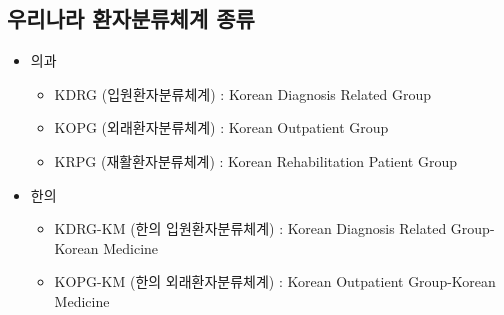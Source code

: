 \subsection{우리나라 환자분류체계 종류}
\begin{itemize}\tightlist
\item 의과
	\begin{itemize}\tightlist
	\item KDRG (입원환자분류체계) : Korean Diagnosis Related Group
	\item KOPG (외래환자분류체계) : Korean Outpatient Group
	\item KRPG (재활환자분류체계) : Korean Rehabilitation Patient Group
	\end{itemize}
\item 한의	
	\begin{itemize}\tightlist
	\item KDRG-KM (한의 입원환자분류체계) : Korean Diagnosis Related Group-Korean Medicine
	\item KOPG-KM (한의 외래환자분류체계) : Korean Outpatient Group-Korean Medicine	
	\end{itemize}
\end{itemize}
\prezi{\clearpage}
